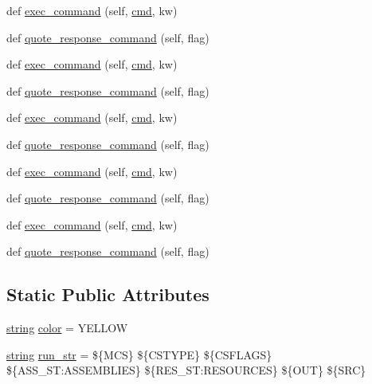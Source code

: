 \begin{DoxyCompactItemize}
\item 
def \hyperlink{classwaflib_1_1_tools_1_1cs_1_1mcs_a37a528e19a48682e93f882769e5c3567}{exec\+\_\+command} (self, \hyperlink{sndfile__play_8m_adfc5ba7e22f5e4a6221c12a70503bef3}{cmd}, kw)
\item 
def \hyperlink{classwaflib_1_1_tools_1_1cs_1_1mcs_a3e0a5b51d31fdd240aaed1914179e79e}{quote\+\_\+response\+\_\+command} (self, flag)
\item 
def \hyperlink{classwaflib_1_1_tools_1_1cs_1_1mcs_a37a528e19a48682e93f882769e5c3567}{exec\+\_\+command} (self, \hyperlink{sndfile__play_8m_adfc5ba7e22f5e4a6221c12a70503bef3}{cmd}, kw)
\item 
def \hyperlink{classwaflib_1_1_tools_1_1cs_1_1mcs_a3e0a5b51d31fdd240aaed1914179e79e}{quote\+\_\+response\+\_\+command} (self, flag)
\item 
def \hyperlink{classwaflib_1_1_tools_1_1cs_1_1mcs_a37a528e19a48682e93f882769e5c3567}{exec\+\_\+command} (self, \hyperlink{sndfile__play_8m_adfc5ba7e22f5e4a6221c12a70503bef3}{cmd}, kw)
\item 
def \hyperlink{classwaflib_1_1_tools_1_1cs_1_1mcs_a3e0a5b51d31fdd240aaed1914179e79e}{quote\+\_\+response\+\_\+command} (self, flag)
\item 
def \hyperlink{classwaflib_1_1_tools_1_1cs_1_1mcs_a37a528e19a48682e93f882769e5c3567}{exec\+\_\+command} (self, \hyperlink{sndfile__play_8m_adfc5ba7e22f5e4a6221c12a70503bef3}{cmd}, kw)
\item 
def \hyperlink{classwaflib_1_1_tools_1_1cs_1_1mcs_a3e0a5b51d31fdd240aaed1914179e79e}{quote\+\_\+response\+\_\+command} (self, flag)
\item 
def \hyperlink{classwaflib_1_1_tools_1_1cs_1_1mcs_a37a528e19a48682e93f882769e5c3567}{exec\+\_\+command} (self, \hyperlink{sndfile__play_8m_adfc5ba7e22f5e4a6221c12a70503bef3}{cmd}, kw)
\item 
def \hyperlink{classwaflib_1_1_tools_1_1cs_1_1mcs_a3e0a5b51d31fdd240aaed1914179e79e}{quote\+\_\+response\+\_\+command} (self, flag)
\end{DoxyCompactItemize}
\subsection*{Static Public Attributes}
\begin{DoxyCompactItemize}
\item 
\hyperlink{test__lib_f_l_a_c_2format_8c_ab02026ad0de9fb6c1b4233deb0a00c75}{string} \hyperlink{classwaflib_1_1_tools_1_1cs_1_1mcs_a9eafa1a8c7ec859637abe49f13ad52fb}{color} = \textquotesingle{}Y\+E\+L\+L\+OW\textquotesingle{}
\item 
\hyperlink{test__lib_f_l_a_c_2format_8c_ab02026ad0de9fb6c1b4233deb0a00c75}{string} \hyperlink{classwaflib_1_1_tools_1_1cs_1_1mcs_a7aa0df137ffc5c73291d49976b99e25b}{run\+\_\+str} = \textquotesingle{}\$\{M\+CS\} \$\{C\+S\+T\+Y\+PE\} \$\{C\+S\+F\+L\+A\+GS\} \$\{A\+S\+S\+\_\+\+S\+T\+:\+A\+S\+S\+E\+M\+B\+L\+I\+ES\} \$\{R\+E\+S\+\_\+\+S\+T\+:\+R\+E\+S\+O\+U\+R\+C\+ES\} \$\{O\+UT\} \$\{S\+RC\}\textquotesingle{}
\end{DoxyCompactItemize}

